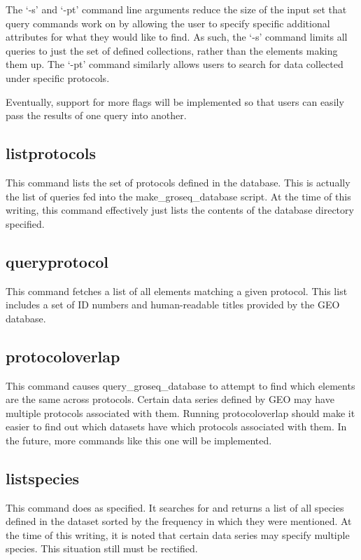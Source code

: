 \documentclass[12pt,letterpaper]{article}
\begin{document}
The `-s' and `-pt' command line arguments reduce the size of the input set that query commands work on by allowing the user to specify specific
additional attributes for what they would like to find. As such, the `-s' command limits all queries to just the set of defined collections, rather than 
the elements making them up. The `-pt' command similarly allows users to search for data collected under specific protocols.

Eventually, support for more flags will be implemented so that users can easily pass the results of one query into another.

\subsection{listprotocols}
This command lists the set of protocols defined in the database. This is actually the list of queries fed into the make\_groseq\_database script. 
At the time of this writing, this command effectively just lists the contents of the database directory specified.

\subsection{queryprotocol}
This command fetches a list of all elements matching a given protocol. This list includes a set of ID numbers and human-readable titles provided by the GEO database.

\subsection{protocoloverlap}
This command causes query\_groseq\_database to attempt to find which elements are the same across protocols. Certain data series defined by GEO may have multiple protocols
associated with them. Running protocoloverlap should make it easier to find out which datasets have which protocols associated with them. In the future, more commands
like this one will be implemented.

\subsection{listspecies}
This command does as specified. It searches for and returns a list of all species defined in the dataset sorted by the frequency in which they were mentioned.
At the time of this writing, it is noted that certain data series may specify multiple species. This situation still must be rectified.
\end{document}
